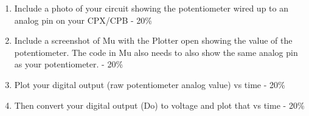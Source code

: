 

\begin{enumerate}[itemsep=-5pt]
\item Include a photo of your circuit showing the potentiometer wired up to an analog pin on your CPX/CPB - 20\%
\item Include a screenshot of Mu with the Plotter open showing the value of the potentiometer. The code in Mu also needs to also show the same analog pin as your potentiometer. - 20\%
\item Plot your digital output (raw potentiometer analog value) vs time - 20\%
\item Then convert your digital output (Do) to voltage and plot that vs time - 20\% 
\end{enumerate}

